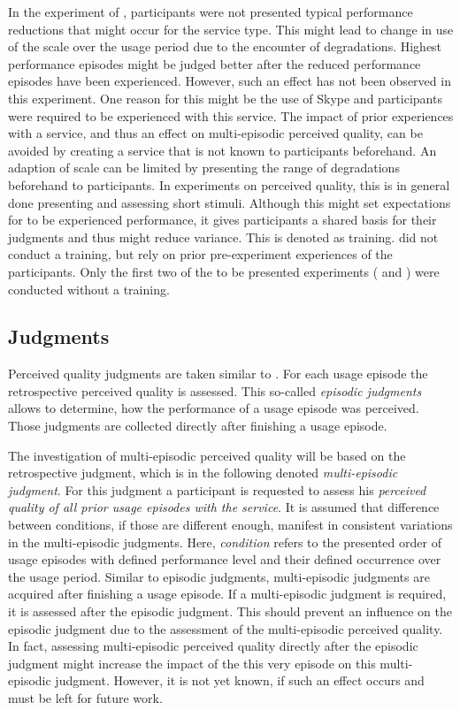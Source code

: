 In the experiment of \citet{moller_single-call_2011}, participants were not presented typical performance reductions that might occur for the service type.
This might lead to change in use of the scale over the usage period due to the encounter of degradations.
Highest performance episodes might be judged better after the reduced performance episodes have been experienced.
However, such an effect has not been observed in this experiment.
One reason for this might be the use of Skype and participants were required to be experienced with this service.
The impact of prior experiences with a service, and thus an effect on multi-episodic perceived quality, can be avoided by creating a service that is not known to participants beforehand.
An adaption of scale can be limited by presenting the range of degradations beforehand to participants.
In experiments on perceived quality, this is in general done presenting and assessing short stimuli.
Although this might set expectations for to be experienced performance, it gives participants a shared basis for their judgments and thus might reduce variance.
This is denoted as training.
\citet{moller_single-call_2011} did not conduct a training, but rely on prior pre-experiment experiences of the participants.
Only the first two of the to be presented experiments ( and ) were conducted without a training.

\subsection{Judgments}
Perceived quality judgments are taken similar to \citet{moller_single-call_2011}.
For each usage episode the retrospective perceived quality is assessed.
This so-called \emph{episodic judgments} allows to determine, how the performance of a usage episode was perceived.
Those judgments are collected directly after finishing a usage episode.

The investigation of multi-episodic perceived quality will be based on the retrospective judgment, which is in the following denoted \emph{multi-episodic judgment}.
For this judgment a participant is requested to assess his \emph{perceived quality of all prior usage episodes with the service}.
It is assumed that difference between conditions, if those are different enough, manifest in consistent variations in the multi-episodic judgments.
Here, \emph{condition} refers to the presented order of usage episodes with defined performance level and their defined occurrence over the usage period.
Similar to episodic judgments, multi-episodic judgments are acquired after finishing a usage episode.
If a multi-episodic judgment is required, it is assessed after the episodic judgment.
This should prevent an influence on the episodic judgment due to the assessment of the multi-episodic perceived quality.
In fact, assessing multi-episodic perceived quality directly after the episodic judgment might increase the impact of the this very episode on this multi-episodic judgment.
However, it is not yet known, if such an effect occurs and must be left for future work.

